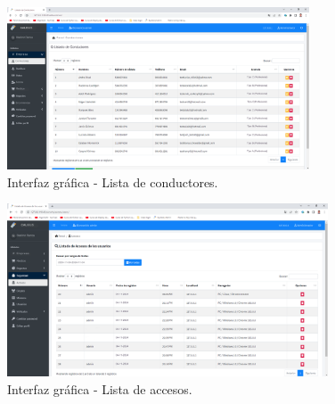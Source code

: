 	\begin{figure}[!h] %
		\caption[Interfaz gráfica - Lista de conductores]
		{\newline Interfaz gráfica - Lista de conductores.} %
		\centering
		\includegraphics[width=0.8\textwidth]{imagenes/cap_3/Img_calibus/CALIBUS23.png} %
		
		\begin{flushleft}
		\end{flushleft}
		\vspace{-16pt}
		\label{fig:cali23} %
	\end{figure}
	
	
	\begin{figure}[!h] %
		\caption[Interfaz gráfica - Lista de accesos]
		{\newline Interfaz gráfica - Lista de accesos.} %
		\centering
		\includegraphics[width=0.85\textwidth]{imagenes/cap_3/Img_calibus/CALIBUS18.png} %
		
		\begin{flushleft}
		\end{flushleft}
		\vspace{-16pt}
		\label{fig:cali18} %
	\end{figure}
	

